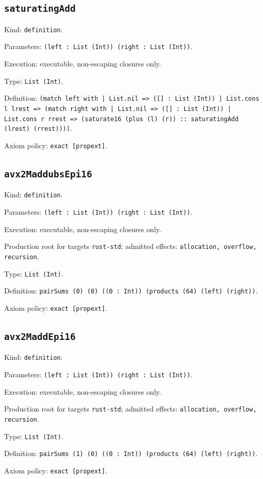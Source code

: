 \documentclass[11pt]{article}
\begin{document}
\subsection*{\texttt{saturatingAdd}}
\noindent Kind: \texttt{definition}.\par
\noindent Parameters: \texttt{(left : List (Int)) (right : List (Int))}.\par
\noindent Execution: executable, non-escaping closures only.\par
\noindent Type: \texttt{List (Int)}.\par
\noindent Definition: \texttt{(match left with | List.nil => ([] : List (Int)) | List.cons l lrest => (match right with | List.nil => ([] : List (Int)) | List.cons r rrest => (saturate16 (plus (l) (r)) :: saturatingAdd (lrest) (rrest))))}.\par
\noindent Axiom policy: \texttt{exact [propext]}.\par
\subsection*{\texttt{avx2MaddubsEpi16}}
\noindent Kind: \texttt{definition}.\par
\noindent Parameters: \texttt{(left : List (Int)) (right : List (Int))}.\par
\noindent Execution: executable, non-escaping closures only.\par
\noindent Production root for targets \texttt{rust-std}; admitted effects: \texttt{allocation, overflow, recursion}.\par
\noindent Type: \texttt{List (Int)}.\par
\noindent Definition: \texttt{pairSums (0) (0) ((0 : Int)) (products (64) (left) (right))}.\par
\noindent Axiom policy: \texttt{exact [propext]}.\par
\subsection*{\texttt{avx2MaddEpi16}}
\noindent Kind: \texttt{definition}.\par
\noindent Parameters: \texttt{(left : List (Int)) (right : List (Int))}.\par
\noindent Execution: executable, non-escaping closures only.\par
\noindent Production root for targets \texttt{rust-std}; admitted effects: \texttt{allocation, overflow, recursion}.\par
\noindent Type: \texttt{List (Int)}.\par
\noindent Definition: \texttt{pairSums (1) (0) ((0 : Int)) (products (64) (left) (right))}.\par
\noindent Axiom policy: \texttt{exact [propext]}.\par
\end{document}

